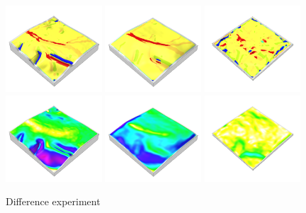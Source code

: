 \documentclass[prodmode,acmtochi]{acmsmall} %
\begin{document}
\begin{figure}[h!]
\begin{center}
		\includegraphics[width=0.32\textwidth]{images/render_3d/forms_4.png}
		\includegraphics[width=0.32\textwidth]{images/render_3d/mean_forms_4.png}
		\includegraphics[width=0.32\textwidth]{images/render_3d/stdev_forms_4.png}
		\includegraphics[width=0.32\textwidth]{images/render_3d/slope_4.png}
		\includegraphics[width=0.32\textwidth]{images/render_3d/mean_slope_4.png}
		\includegraphics[width=0.32\textwidth]{images/render_3d/stdev_slope_4.png}
	\caption{Difference experiment}
	\label{fig:}
\end{center}
\end{figure}
\end{document}
